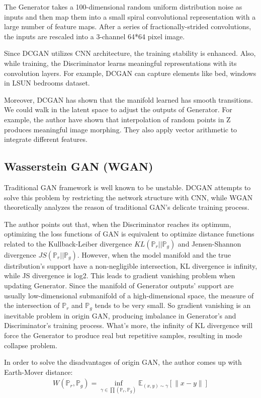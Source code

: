 The Generator takes a 100-dimensional random uniform distribution noise as inputs and then map them into a small spiral convolutional representation with a large number of feature maps. After a series of fractionally-strided convolutions, the inputs are rescaled into a 3-channel 64*64 pixel image. 

Since DCGAN utilizes CNN architecture, the training stability is enhanced. Also, while training, the Discriminator learns meaningful representations with its convolution layers. For example, DCGAN can capture elements like bed, windows in LSUN bedrooms dataset. 

Moreover, DCGAN has shown that the manifold learned has smooth transitions. We could walk in the latent space to adjust the outputs of Generator. For example, the author have shown that interpolation of random points in Z produces meaningful image morphing. They also apply vector arithmetic to integrate different features.


\subsection{Wasserstein GAN (WGAN)}
Traditional GAN framework is well known to be unstable. DCGAN attempts to solve this problem by restricting the network structure with CNN, while WGAN theoretically analyzes the reason of traditional GAN's delicate training process.

The author points out that, when the Discriminator reaches its optimum, optimizing the loss functions of GAN is equivalent to optimize distance functions related to the Kullback-Leiber divergence $KL(\mathbb{P}_r||\mathbb{P}_g)$ and Jensen-Shannon divergence $JS(\mathbb{P}_r||\mathbb{P}_g)$. However, when the model manifold and the true distribution's support have a non-negligible intersection, KL divergence is infinity, while JS divergence is log2. This leads to gradient vanishing problem when updating Generator. Since the manifold of Generator outputs' support are usually low-dimensional submanifold of a high-dimensional space, the measure of the intersection of $\mathbb{P}_r$ and $\mathbb{P}_g$ tends to be very small. So gradient vanishing is an inevitable problem in origin GAN, producing imbalance in Generator’s and Discriminator’s training process. What's more, the infinity of KL divergence will force the Generator to produce real but repetitive samples, resulting in mode collapse problem.

In order to solve the disadvantages of origin GAN, the author comes up with Earth-Mover distance:
\begin{equation}
\begin{aligned}
W(\mathbb{P}_r,\mathbb{P}_g) = \inf \limits_{\gamma \in \prod(\mathbb{P}_r,\mathbb{P}_g)} \mathbb{E}_{(x,y)\sim \gamma}[\|x-y\|]
\end{aligned}
\end{equation}

